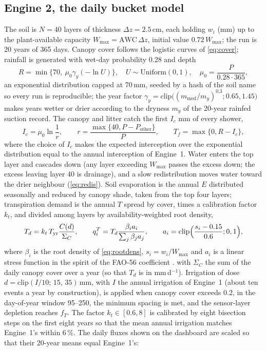 \documentclass[preprint,12pt]{elsarticle}
\begin{document}
\subsection{Engine 2, the daily bucket model}
The soil is $N=40$ layers of thickness $\Delta z=2.5$\,cm, each holding $w_i$ (mm) up to the plant-available capacity $W_{\max}=\mathrm{AWC}\,\Delta z$, initial value $0.72\,W_{\max}$; the run is 20 years of 365 days. Canopy cover follows the logistic curves of \cref{eq:cover}; rainfall is generated with wet-day probability 0.28 and depth
\begin{equation}
R=\min\{70,\ \mu_0\gamma_y(-\ln U)\},\quad U\sim\mathrm{Uniform}(0,1),\quad \mu_0=\frac{P}{0.28\cdot365},
\label{eq:rain}
\end{equation}
an exponential distribution capped at 70\,mm, seeded by a hash of the soil name so every run is reproducible; the year factor $\gamma_y=\mathrm{clip}\bigl((m_{\mathrm{med}}/m_y)^{0.3};0.65,1.45\bigr)$ makes years wetter or drier according to the dryness $m_y$ of the 20-year rainfed suction record. The canopy and litter catch the first $I_c$ mm of every shower,
\begin{equation}
I_c=\mu_0\ln\frac1r,\qquad r=\frac{\max\{40,P-P_{\mathrm{other}}\}}{P},\qquad T_f=\max\{0,R-I_c\},
\label{eq:interc}
\end{equation}
where the choice of $I_c$ makes the expected interception over the exponential distribution equal to the annual interception of Engine~1. Water enters the top layer and cascades down (any layer exceeding $W_{\max}$ passes the excess down; the excess leaving layer 40 is drainage), and a slow redistribution moves water toward the drier neighbour (\cref{eq:redis}). Soil evaporation is the annual $E$ distributed seasonally and reduced by canopy shade, taken from the top four layers; transpiration demand is the annual $T$ spread by cover, times a calibration factor $k_t$, and divided among layers by availability-weighted root density,
\begin{equation}
T_d=k_t\,T_{\mathrm{yr}}\frac{C(d)}{\Sigma_C},\qquad q_i^{T}=T_d\frac{\beta_i a_i}{\sum_j\beta_ja_j},\qquad a_i=\mathrm{clip}\Bigl(\frac{s_i-0.15}{0.6};0,1\Bigr),
\label{eq:transp}
\end{equation}
where $\beta_i$ is the root density of \cref{eq:rootdens}, $s_i=w_i/W_{\max}$ and $a_i$ is a linear stress function in the spirit of the FAO-56 coefficient \cite{Allen1998}. with $\Sigma_C$ the sum of the daily canopy cover over a year (so that $T_d$ is in mm\,d$^{-1}$). Irrigation of dose $d=\mathrm{clip}(I/10;\,15,\,35)$\,mm, with $I$ the annual irrigation of Engine~1 (about ten events a year by construction), is applied when canopy cover exceeds 0.2, in the day-of-year window 95--250, the minimum spacing is met, and the sensor-layer depletion reaches $f_T$. The factor $k_t\in[0.6,8]$ is calibrated by eight bisection steps on the first eight years so that the mean annual irrigation matches Engine~1's within 6\,\%. The daily fluxes shown on the dashboard are scaled so that their 20-year means equal Engine~1's:
\end{document}
